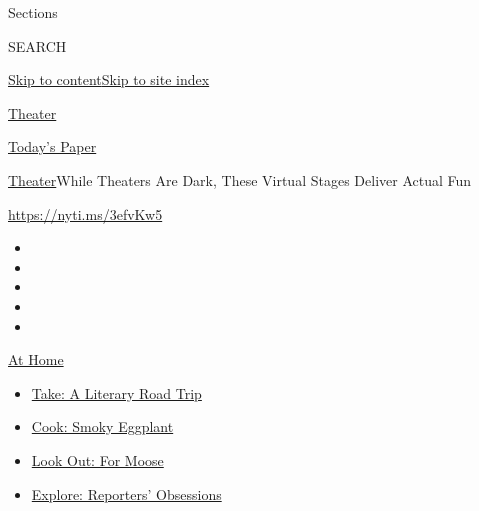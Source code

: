 Sections

SEARCH

\protect\hyperlink{site-content}{Skip to
content}\protect\hyperlink{site-index}{Skip to site index}

\href{https://www.nytimes3xbfgragh.onion/section/theater}{Theater}

\href{https://myaccount.nytimes3xbfgragh.onion/auth/login?response_type=cookie\&client_id=vi}{}

\href{https://www.nytimes3xbfgragh.onion/section/todayspaper}{Today's
Paper}

\href{/section/theater}{Theater}\textbar{}While Theaters Are Dark, These
Virtual Stages Deliver Actual Fun

\url{https://nyti.ms/3efvKw5}

\begin{itemize}
\item
\item
\item
\item
\item
\end{itemize}

\href{https://www.nytimes3xbfgragh.onion/spotlight/at-home?action=click\&pgtype=Article\&state=default\&region=TOP_BANNER\&context=at_home_menu}{At
Home}

\begin{itemize}
\tightlist
\item
  \href{https://www.nytimes3xbfgragh.onion/2020/07/28/books/time-for-a-literary-road-trip.html?action=click\&pgtype=Article\&state=default\&region=TOP_BANNER\&context=at_home_menu}{Take:
  A Literary Road Trip}
\item
  \href{https://www.nytimes3xbfgragh.onion/2020/07/29/magazine/bored-with-your-home-cooking-some-smoky-eggplant-will-fix-that.html?action=click\&pgtype=Article\&state=default\&region=TOP_BANNER\&context=at_home_menu}{Cook:
  Smoky Eggplant}
\item
  \href{https://www.nytimes3xbfgragh.onion/2020/07/27/travel/moose-michigan-isle-royale.html?action=click\&pgtype=Article\&state=default\&region=TOP_BANNER\&context=at_home_menu}{Look
  Out: For Moose}
\item
  \href{https://www.nytimes3xbfgragh.onion/interactive/2020/at-home/even-more-reporters-editors-diaries-lists-recommendations.html?action=click\&pgtype=Article\&state=default\&region=TOP_BANNER\&context=at_home_menu}{Explore:
  Reporters' Obsessions}
\end{itemize}

